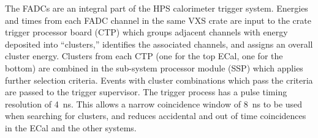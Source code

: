The FADCs are an integral part of the HPS calorimeter trigger system. Energies  
and times from each FADC channel in the same VXS crate are input to the crate trigger
processor board (CTP) which groups adjacent channels with energy deposited into ``clusters,'' identifies the associated channels, and
assigns an overall cluster energy. Clusters  
from each CTP (one for the top ECal, one for the bottom) are combined in the sub-system processor module (SSP) 
which applies further selection criteria. Events with cluster combinations which pass the criteria are
passed to the trigger supervisor. The trigger process has a pulse timing resolution of 4~ns. This allows a narrow 
coincidence window of 8~ns to be used when searching for clusters, and reduces accidental and out of time coincidences in the ECal 
and the other systems. 

